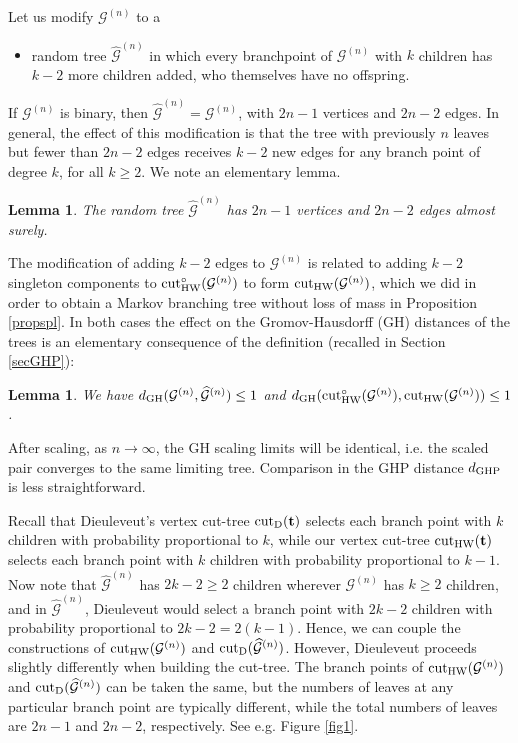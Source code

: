 \documentclass[11pt,a4paper]{article}
\newtheorem{lm}[prop]{Lemma}
\newcommand{\cG}{\mathcal{G}}
\newcommand{\ft}{\mathbf{t}}
\newcommand{\modcut}{{\rm cut}_{\rm HW}}
\newcommand{\ourcut}{{\rm cut}_{\rm HW}^\circ}
\begin{document}
Let us modify $\cG^{(n)}$ to a 
\begin{itemize}\item random tree $\widehat{\cG}^{(n)}$ in which every branchpoint of $\cG^{(n)}$ with $k$ children has $k-2$ more children added, who themselves have no
    offspring.
\end{itemize}
If $\cG^{(n)}$ is binary, then $\widehat{\cG}^{(n)}=\cG^{(n)}$, with $2n-1$ vertices and $2n-2$ edges. In general, the effect of this modification is that the tree
with previously $n$ leaves but fewer than $2n-2$ edges receives $k-2$ new edges for any branch point of degree $k$, for all $k\ge 2$. We note an elementary lemma.
\begin{lm}\label{edgelemma} The random tree $\widehat{\cG}^{(n)}$ has $2n-1$ vertices and $2n-2$ edges almost surely.
\end{lm}
The modification of adding $k-2$ edges to $\cG^{(n)}$ is related to adding $k-2$ singleton components to $\ourcut(\cG^{(n)})$ to form
$\modcut(\cG^{(n)})$, which we did in order to obtain a Markov branching tree without loss of mass in Proposition \ref{propspl}. In both cases the
effect on the Gromov-Hausdorff (GH) distances of the trees is an elementary consequence of the definition (recalled in Section \ref{secGHP}):
\begin{lm}\label{lmcut} We have $d_{\rm GH}(\cG^{(n)},\widehat{\cG}^{(n)})\le 1$ and $d_{\rm GH}(\ourcut(\cG^{(n)}),\modcut(\cG^{(n)}))\le 1$.
\end{lm}
After scaling, as $n\rightarrow\infty$, the GH scaling limits will be identical, i.e. the scaled pair converges to the same limiting tree.
Comparison in the GHP distance $d_{\rm GHP}$ is less straightforward.

Recall that Dieuleveut's vertex cut-tree ${\rm cut}_{\rm D}(\ft )$ selects each branch point with $k$ children with probability proportional to $k$, while our vertex
cut-tree $\modcut(\ft )$ selects each branch point with $k$ children with probability proportional to $k-1$. Now note that $\widehat{\cG}^{(n)}$ has $2k-2\ge 2$
children wherever $\cG^{(n)}$ has $k\ge 2$ children, and in $\widehat{\cG}^{(n)}$, Dieuleveut would select a branch point with $2k-2$ children with probability proportional
to $2k-2=2(k-1)$. Hence, we can couple the constructions of $\modcut(\cG^{(n)})$ and ${\rm cut}_{\rm D}(\widehat{\cG}^{(n)})$. However, Dieuleveut proceeds slightly differently when building the cut-tree. The branch points of $\modcut(\cG^{(n)})$ and ${\rm cut}_{\rm D}(\widehat{\cG}^{(n)})$ can be taken the
same, but the numbers of leaves at any particular branch point are typically different, while the total numbers of leaves are $2n-1$ and $2n-2$, respectively. See e.g. Figure \ref{fig1}. 
\end{document}
